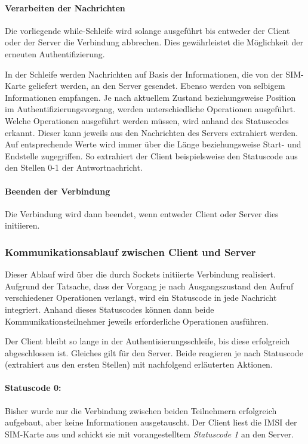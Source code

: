         \paragraph{Verarbeiten der Nachrichten} Die vorliegende while-Schleife wird solange ausgeführt
        bis entweder der Client oder der Server die Verbindung abbrechen. Dies gewährleistet die
        Möglichkeit der erneuten Authentifizierung.

        In der Schleife werden Nachrichten auf Basis der Informationen, die von der SIM-Karte geliefert werden,
        an den Server gesendet. Ebenso werden von selbigem Informationen empfangen. Je nach aktuellem Zustand
        beziehungsweise Position im Authentifizierungsvorgang, werden unterschiedliche Operationen ausgeführt.
        Welche Operationen ausgeführt werden müssen, wird anhand des Statuscodes erkannt. Dieser kann
        jeweils aus den Nachrichten des Servers extrahiert werden. Auf entsprechende Werte wird immer
        über die Länge beziehungsweise Start- und Endstelle zugegriffen. So extrahiert der Client beispielsweise
        den Statuscode aus den Stellen 0-1 der Antwortnachricht.

        \paragraph{Beenden der Verbindung} Die Verbindung wird dann beendet, wenn entweder Client
        oder Server dies initiieren. 
	
    \subsubsection[Kommunikationsablauf zwischen Client und Server (Schenkel)]{Kommunikationsablauf zwischen Client und Server}
    Dieser Ablauf wird über die durch Sockets initiierte Verbindung realisiert. Aufgrund
    der Tatsache, dass der Vorgang je nach Ausgangszustand den Aufruf verschiedener Operationen
    verlangt, wird ein Statuscode in jede Nachricht integriert. Anhand dieses Statuscodes
    können dann beide Kommunikationsteilnehmer jeweils erforderliche Operationen ausführen.

    Der Client bleibt so lange in der Authentisierungsschleife, bis diese erfolgreich abgeschlossen ist.
    Gleiches gilt für den Server. Beide reagieren je nach Statuscode (extrahiert aus den ersten Stellen)
    mit nachfolgend erläuterten Aktionen.

    \paragraph{Statuscode 0:} Bisher wurde nur die Verbindung zwischen beiden Teilnehmern erfolgreich aufgebaut,
    aber keine Informationen ausgetauscht. Der Client liest die IMSI der SIM-Karte aus und schickt sie mit
    vorangestelltem \textit{Statuscode 1} an den Server.

